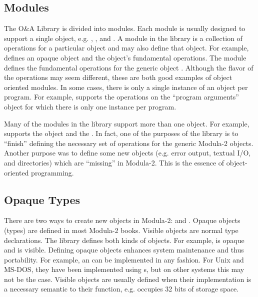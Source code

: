 \subsection{Modules}

The O\&A Library is divided into modules.  Each module is usually
designed to support a single object, e.g. , ,
and .
A module in the library is a collection of operations for a particular
object and may also define that object.  For example, 
defines an opaque object and the object's fundamental operations.
The module  defines the fundamental operations for the
generic object .  Although the flavor of the operations
may seem different, these are both good examples of object oriented modules.
In some cases, there is only a single instance of an object per program.
For example,  supports the operations on the
``program arguments'' object for which there is only one instance
per program.  

Many of the modules in the library support more than one object.  For
example,  supports the  object and the 
.  In fact, one of the purposes of the library
is to ``finish'' defining the necessary set of operations for the
generic Modula-2 objects.  Another purpose was to define some new objects
(e.g. error output, textual I/O, and directories) which are ``missing''
in Modula-2.  This is the essence of object-oriented programming.


\subsection{Opaque Types}

There are two ways to create new objects in Modula-2:  and
.  Opaque objects (types) are defined in most 
Modula-2 books.  Visible objects are normal type declarations.  The
library defines both kinds of objects.  For example,  is
opaque and  is visible.  Defining opaque objects
enhances system maintenance and thus portability.   For example, an
 can be implemented in any fashion.  For Unix and 
MS-DOS, they have been implemented using s, but
on other systems this may not be the case.
Visible objects are usually defined when their implementation is
a necessary semantic to their function, e.g. 
occupies 32 bits of storage space.  

